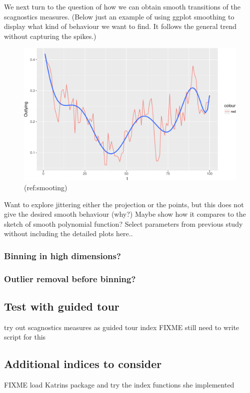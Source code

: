 \documentclass[article]{jss}
\begin{document}
We next turn to the question of how we can obtain smooth transitions of
the scagnostics measures. (Below just an example of using ggplot
smoothing to display what kind of behaviour we want to find. It follows
the general trend without capturing the spikes.)

\begin{CodeChunk}
\begin{figure}

{\centering \includegraphics[width=\textwidth]{figure/smoothing-1} 

}

\caption[(ref:smooting)]{(ref:smooting)}\label{fig:smoothing}
\end{figure}
\end{CodeChunk}

Want to explore jittering either the projection or the points, but this
does not give the desired smooth behaviour (why?) Maybe show how it
compares to the sketch of smooth polynomial function? Select parameters
from previous study without including the detailed plots here..

\subsubsection{Binning in high
dimensions?}\label{binning-in-high-dimensions}

\subsubsection{Outlier removal before
binning?}\label{outlier-removal-before-binning}

\subsection{Test with guided tour}\label{test-with-guided-tour}

try out scagnostics measures as guided tour index FIXME still need to
write script for this

\subsection{Additional indices to
consider}\label{additional-indices-to-consider}

FIXME load Katrins package and try the index functions she implemented
\end{document}
